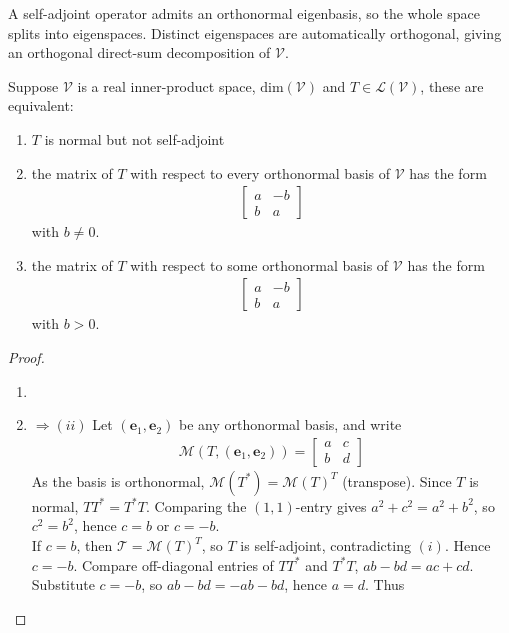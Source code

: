 A self-adjoint operator admits an orthonormal eigenbasis, so the whole space splits into eigenspaces. Distinct eigenspaces are automatically orthogonal, giving an orthogonal direct-sum decomposition of $\mathcal{V}$.

\begin{lemma} \label{lem:realinnerprodspaceequiv} Suppose $\mathcal{V}$ is a real inner-product space, $\text{dim}(\mathcal{V})$ and $T \in \mathcal{L}(\mathcal{V})$, these are equivalent:
\begin{enumerate}[label=\roman*.]
\setlength{\itemsep}{0pt}
\item $T$ is normal but not self-adjoint
\item the matrix of $T$ with respect to every orthonormal basis of $\mathcal{V}$ has the form
\begin{align}
\begin{bmatrix}
a & -b \\
b & a
\end{bmatrix} \nonumber
\end{align}
with $b \neq 0$.
\item the matrix of $T$ with respect to some orthonormal basis of $\mathcal{V}$ has the form
\begin{align}
\begin{bmatrix}
a & -b \\
b & a
\end{bmatrix} \nonumber
\end{align}
with $b > 0$.
\end{enumerate}
\begin{proof} 
\begin{enumerate}[label=\roman*.]
\setlength{\itemsep}{0pt}
\item[]
\item[$(i)$]$\Rightarrow (ii)$ Let $(\mathbf{e}_1, \mathbf{e}_2)$ be any orthonormal basis, and write
\begin{align}
\mathcal{M}(T, (\mathbf{e}_1, \mathbf{e}_2)) =
\begin{bmatrix}
a & c \\
b & d
\end{bmatrix} \nonumber
\end{align}
As the basis is orthonormal, $\mathcal{M}(T^*) = \mathcal{M}(T)^T$ (transpose). Since $T$ is normal, $T T^* = T^* T$. Comparing the $(1,1)$-entry gives $a^2 + c^2 = a^2 + b^2$, so $c^2 = b^2$, hence $c=b$ or $c = -b$.\\
If $c=b$, then $\mathcal{T} = \mathcal{M}(T)^T$, so $T$ is self-adjoint, contradicting $(i)$. Hence $c = -b$. Compare off-diagonal entries of $TT^*$ and $T^* T$, $ab - bd = ac + cd$. Substitute $c = -b$, so $ab - bd = -ab - bd$, hence $a=d$. Thus

\end{enumerate}
\end{proof}
\end{lemma}
